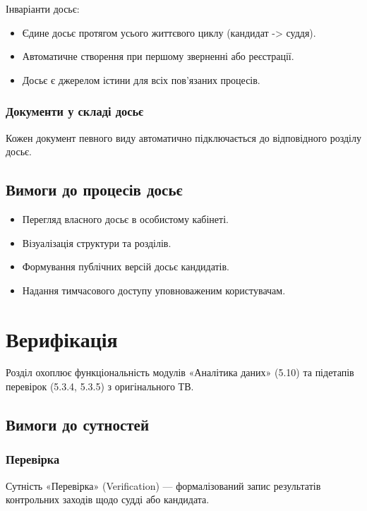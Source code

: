 \documentclass{article}
\begin{document}
Інваріанти досьє:
\begin{itemize}
\item Єдине досьє протягом усього життєвого циклу (кандидат -> суддя).
\item Автоматичне створення при першому зверненні або реєстрації.
\item Досьє є джерелом істини для всіх пов’язаних процесів.
\end{itemize}

\subsubsection{Документи у складі досьє}
Кожен документ певного виду автоматично підключається до відповідного розділу досьє.

\subsection{Вимоги до процесів досьє}

\begin{itemize}
\item Перегляд власного досьє в особистому кабінеті.
\item Візуалізація структури та розділів.
\item Формування публічних версій досьє кандидатів.
\item Надання тимчасового доступу уповноваженим користувачам.
\end{itemize}

\newpage
\section{Верифікація}

Розділ охоплює функціональність модулів «Аналітика даних» (5.10) та підетапів перевірок (5.3.4, 5.3.5) з оригінального ТВ.

\subsection{Вимоги до сутностей}

\subsubsection{Перевірка}
Сутність «Перевірка» (Verification) — формалізований запис результатів контрольних заходів щодо судді або кандидата.
\end{document}
